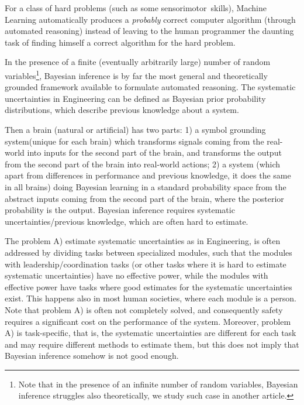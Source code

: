 \documentclass[11pt]{book}
\begin{document}
For a class of hard problems (such as some sensorimotor~skills), Machine
Learning automatically produces a \emph{probably} correct computer
algorithm (through automated reasoning) instead of leaving to the human
programmer the daunting task of finding himself a correct algorithm for
the hard problem.

In the presence of a finite (eventually arbitrarily large) number of
random variables\footnote{Note that in the presence of an infinite
  number of random variables, Bayesian inference struggles also
  theoretically, we study such case in another article.}, Bayesian
inference is by far the most general and theoretically grounded
framework available to formulate automated
reasoning\cite{laumann_when_2020}\cite{jihan_re_2019}. The
systematic uncertainties in Engineering can be defined as Bayesian prior
probability
distributions\cite{dupont_data_2022}, which describe previous knowledge
about a system.

Then a brain (natural or artificial) has two parts: 1) a symbol
grounding system\cite{harnad_symbol_1990}(unique for each brain) which transforms signals coming from the
real-world into inputs for the second part of the brain, and transforms
the output from the second part of the brain into real-world actions; 2)
a system (which apart from differences in performance and previous
knowledge, it does the same in all brains) doing Bayesian learning in a
standard probability space from the abstract inputs coming from the
second part of the brain, where the posterior probability is the output.
Bayesian inference requires systematic uncertainties/previous
knowledge\cite{hullermeier_aleatoric_2021}, which are often hard to estimate.

The problem A) estimate systematic uncertainties as in Engineering, is
often addressed by dividing tasks between specialized
modules\cite{roychowdhury_regularizing_2021}, such that the modules with
leadership/coordination tasks (or other tasks where it is hard to
estimate systematic uncertainties) have no effective power, while the
modules with effective power have tasks where good estimates for the
systematic uncertainties exist. This happens also in most human
societies, where each module is a person. Note that problem A) is often
not completely solved, and consequently safety requires a significant
cost on the performance of the system. Moreover, problem A) is
task-specific, that is, the systematic uncertainties are different for
each task and may require different methods to estimate them, but this
does not imply that Bayesian inference somehow is not good enough.
\end{document}
